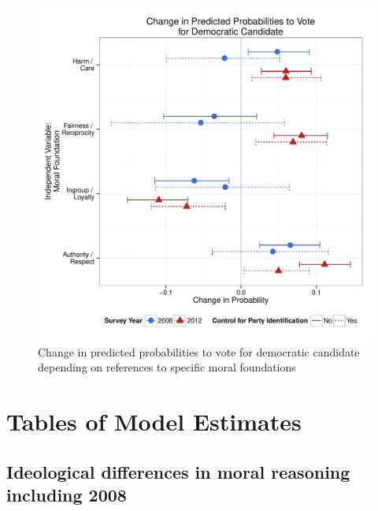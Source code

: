 \documentclass[12pt]{article}
\begin{document}
\begin{figure}\centering
\includegraphics[scale=.4]{../calc/fig/appD12vote.pdf}
\caption{Change in predicted probabilities to vote for democratic candidate depending on references to specific moral foundations}\label{fig:appD12vote}
\end{figure}



\clearpage
\section{Tables of Model Estimates}\label{app:tables}
\renewcommand\thefigure{\thesection.\arabic{figure}}
\renewcommand\thetable{\thesection.\arabic{table}}
\setcounter{figure}{0}
\setcounter{table}{0}


\subsection{Ideological differences in moral reasoning including 2008}










\end{document}

